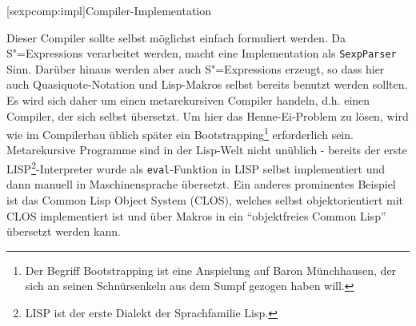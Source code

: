 \documentclass[11pt, a4paper, bibgerm]{scrbook}
\newcommand\icode[1]{\lstinline?#1?}
\newcommand\lsection{}
\newcommand{\sexps}{S"=Expressions}
\begin{document}
\lsection[sexpcomp:impl]{Compiler-Implementation}

Dieser Compiler sollte selbst möglichst einfach formuliert werden. Da
\sexps{} verarbeitet werden, macht eine Implementation als
\icode{SexpParser} Sinn. Darüber hinaus werden aber auch \sexps{}
erzeugt, so dass hier auch Quasiquote-Notation und Lisp-Makros selbst
bereits benutzt werden sollten. Es wird sich daher um einen
metarekursiven Compiler handeln, d.h. einen Compiler, der sich selbst
übersetzt. Um hier das Henne-Ei-Problem zu lösen, wird wie im
Compilerbau üblich später ein Bootstrapping\footnote{Der Begriff
  Bootstrapping ist eine Anspielung auf Baron Münchhausen, der sich an
  seinen Schnürsenkeln aus dem Sumpf gezogen haben will.} erforderlich
sein. Metarekursive Programme sind in der Lisp-Welt nicht unüblich -
bereits der erste LISP\footnote{LISP ist der erste Dialekt der
  Sprachfamilie Lisp.}-Interpreter wurde als \icode{eval}-Funktion in
LISP selbst implementiert und dann manuell in Maschinensprache
übersetzt\cite{LispHistory}. Ein anderes prominentes Beispiel ist das
Common Lisp Object System (CLOS)\cite{MetaobjectProtocol}, welches
selbst objektorientiert mit CLOS implementiert ist und über Makros in
ein ``objektfreies Common Lisp'' übersetzt werden kann.
\end{document}
